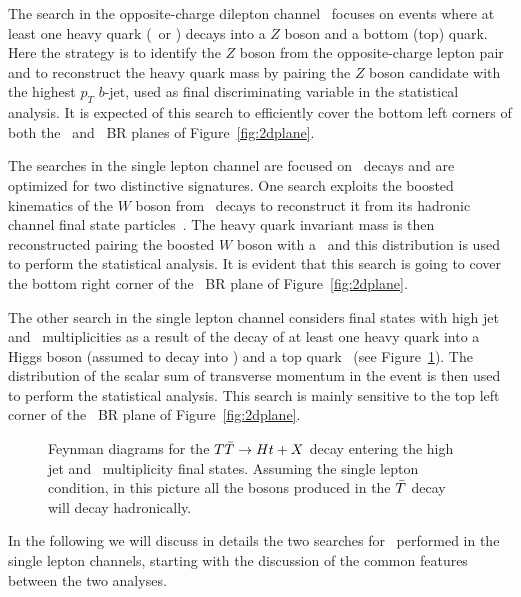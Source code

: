 The search in the opposite-charge dilepton channel~\cite{ATLAS-CONF-2013-056} 
focuses on events where at least one
heavy quark  (\B\ or \T) decays into a $Z$ boson and a bottom (top) quark. 
Here the strategy is to identify the $Z$ boson from the opposite-charge lepton
pair and to reconstruct the heavy quark mass 
by pairing the $Z$ boson candidate with the highest 
$p_T$ $b$-jet, used as final discriminating variable in the statistical analysis.
It is expected of this search to efficiently cover the bottom
left corners of both the \B\ and \T\ BR planes of
Figure~\ref{fig:2dplane}.


The searches in the single lepton channel are focused on \TT\ 
decays and are optimized for two distinctive signatures. One search
exploits the boosted kinematics of the $W$ boson from \T\ decays
to reconstruct it from its hadronic channel final state 
particles~\cite{ATLAS-CONF-2013-060}. The heavy quark invariant mass is 
then reconstructed pairing the boosted  $W$ boson  with a \bjet\ and this
distribution is used to perform the statistical analysis. It is evident that this
search is going to cover the bottom right corner of the \T\  BR plane 
of Figure~\ref{fig:2dplane}.

The other search in the single lepton channel considers final states with high
jet and \bjet\ multiplicities as a result of the decay of at least one heavy quark
into a Higgs boson (assumed to decay into \bbbar) and a top 
quark~\cite{ATLAS-CONF-2013-018} (see Figure~\ref{fig:feyndHTX}). The distribution
of the scalar sum of transverse momentum in the event is then used to perform the statistical 
analysis. This search is mainly sensitive to the top left corner of the \T\  
BR plane of Figure~\ref{fig:2dplane}.


\begin{figure}[hbt]
\begin{center}
        \myskip\myskip
	\caption{Feynman diagrams for the $\TTbar\to Ht+X$
        decay entering the high jet and \bjet\ multiplicity final states.
        Assuming the single lepton condition, in this picture all the bosons 
        produced in the $\Tbar$ decay will decay hadronically.\label{fig:feyndHTX}}
\end{center}
\end{figure}



In the following we will discuss in details the two searches for 
\TT\ performed in the single lepton channels, starting with the
discussion of the common features between the two analyses.


